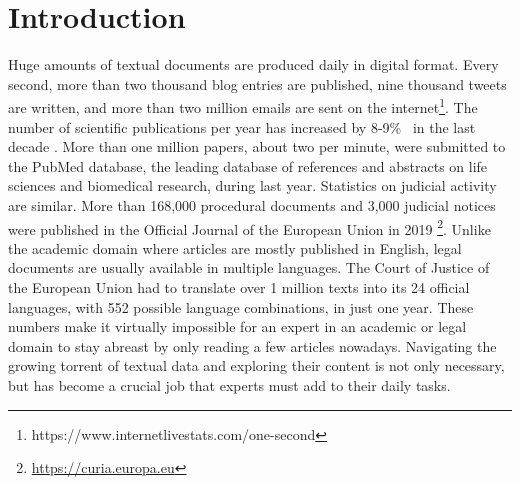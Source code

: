 

\chapter{Introduction}\label{ch:introduction}

\graphicspath{{introduction/figures/}}




Huge amounts of textual documents are produced daily in digital format. Every second, more than two thousand blog entries are published, nine thousand tweets are written, and more than two million emails are sent on the internet\footnote{https://www.internetlivestats.com/one-second}. The number of scientific publications per year has increased by 8-9\%~ in the last decade \citep{Ware2018STM}. More than one million papers, about two per minute,  were submitted to the PubMed database, the leading database of references and abstracts on life sciences and biomedical research, during last year. Statistics on judicial activity are similar. More than 168,000 procedural documents and 3,000 judicial notices were published in the Official Journal of the European Union in 2019 \footnote{\url{https://curia.europa.eu}}. Unlike the academic domain where articles are mostly published in English, legal documents are usually available in multiple languages. The Court of Justice of the European Union had to translate over 1 million texts into its 24 official languages, with 552 possible language combinations, in just one year. These numbers make it virtually impossible for an expert in an academic or legal domain to stay abreast by only reading a few articles nowadays. Navigating the growing torrent of textual data and exploring their content is not only necessary, but has become a crucial job that experts must add to their daily tasks. 

